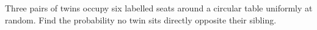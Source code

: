 Three pairs of twins occupy six labelled seats around a circular table uniformly at random. Find the probability no twin sits directly opposite their sibling.
